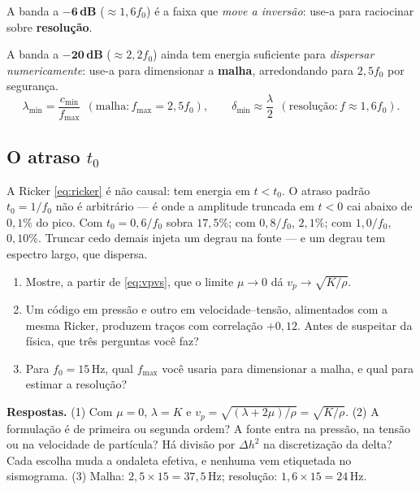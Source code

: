 \documentclass[11pt,a4paper,oneside]{report}
\begin{document}
\begin{atencao}
A banda a $\mathbf{-6}$\,\textbf{dB} ($\approx 1{,}6 f_0$) \'e a faixa que
\emph{move a invers\~ao}: use-a para raciocinar sobre \textbf{resolu\c{c}\~ao}.

A banda a $\mathbf{-20}$\,\textbf{dB} ($\approx 2{,}2 f_0$) ainda tem energia
suficiente para \emph{dispersar numericamente}: use-a para dimensionar a
\textbf{malha}, arredondando para $2{,}5 f_0$ por seguran\c{c}a.
\begin{equation}
\lambda_{\min} = \frac{c_{\min}}{f_{\max}}
 \ \ (\text{malha}: f_{\max} = 2{,}5 f_0),
\qquad
\delta_{\min} \approx \frac{\lambda}{2}
 \ \ (\text{resolu\c{c}\~ao}: f \approx 1{,}6 f_0).
\end{equation}
\end{atencao}

\subsection*{O atraso $t_0$}

A Ricker \eqref{eq:ricker} \'e n\~ao causal: tem energia em $t < t_0$. O
atraso padr\~ao $t_0 = 1/f_0$ n\~ao \'e arbitr\'ario --- \'e onde a amplitude
truncada em $t<0$ cai abaixo de $0{,}1\%$ do pico. Com
$t_0 = 0{,}6/f_0$ sobra $17{,}5\%$; com $0{,}8/f_0$, $2{,}1\%$; com
$1{,}0/f_0$, $0{,}10\%$. Truncar cedo demais injeta um degrau na fonte --- e
um degrau tem espectro largo, que dispersa.

\begin{exercicio}
\begin{enumerate}[leftmargin=*, itemsep=2pt]
\item Mostre, a partir de \eqref{eq:vpvs}, que o limite $\mu\to 0$ d\'a
$v_p \to \sqrt{K/\rho}$.
\item Um c\'odigo em press\~ao e outro em velocidade--tens\~ao, alimentados
com a mesma Ricker, produzem tra\c{c}os com correla\c{c}\~ao $+0{,}12$. Antes
de suspeitar da f\'isica, que tr\^es perguntas voc\^e faz?
\item Para $f_0 = 15$\,Hz, qual $f_{\max}$ voc\^e usaria para dimensionar a
malha, e qual para estimar a resolu\c{c}\~ao?
\end{enumerate}
\textbf{Respostas.} (1) Com $\mu = 0$, $\lambda = K$ e
$v_p = \sqrt{(\lambda+2\mu)/\rho} = \sqrt{K/\rho}$. (2) A formula\c{c}\~ao \'e
de primeira ou segunda ordem? A fonte entra na press\~ao, na tens\~ao ou na
velocidade de part\'icula? H\'a divis\~ao por $\Delta h^{2}$ na
discretiza\c{c}\~ao da delta? Cada escolha muda a ondaleta efetiva, e nenhuma
vem etiquetada no sismograma. (3) Malha: $2{,}5\times15 = 37{,}5$\,Hz;
resolu\c{c}\~ao: $1{,}6\times15 = 24$\,Hz.
\end{exercicio}
\end{document}
